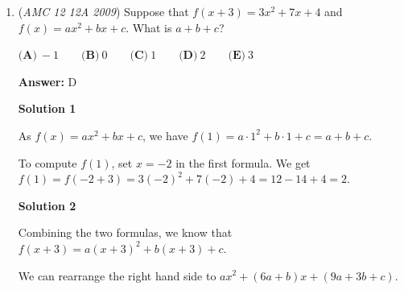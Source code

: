 \begin{enumerate}
 



\textbf{Solution 2}

Let the side length of the smaller square be $1$, and let the smaller side of the rectangles be $y$. Since the larger square's area is four times larger than the smaller square's, the larger square's side length is $2$. $2$ is equivalent to $2y+1$, giving $y=1/2$. Then, the longer side of the rectangles is $3/2$. $\frac{\frac{3}{2}}{\frac{1}{2}}=\boxed{3}$.

 



\textbf{Solution 3}

Let the longer side length be $x$, and the shorter side be $a$.

 We have that $(x+a)^2=4(x-a)^2\implies x+a=2(x-a)\implies x+a=2x-2a\implies x=3a \implies \frac{x}{a}=3$

 Hence, the answer is $\boxed{A}\implies 3$




\textbf{Solution 4}

WLOG, let the shorter side of the rectangle be $1$, and the longer side be $x$ . Thus, the area of the larger square is $(1+x)^2$ . The area of the smaller square is $(x-1)^2$ . Thus, we have the equation $(1+x)^2 = 4 (x-1)^2$ . Solving for $x$, we get $x$ = $3$ .

 


	\item (\textit{AMC 12 12A 2009}) Suppose that $f(x+3)=3x^2 + 7x + 4$ and $f(x)=ax^2 + bx + c$. What is $a+b+c$?


 $\textbf{(A)}\ -1 \qquad \textbf{(B)}\ 0 \qquad \textbf{(C)}\ 1 \qquad \textbf{(D)}\ 2 \qquad \textbf{(E)}\ 3$

 \textbf{Answer: }D



\textbf{Solution 1}

As $f(x)=ax^2 + bx + c$, we have $f(1)=a\cdot 1^2 + b\cdot 1 + c = a+b+c$. 

 To compute $f(1)$, set $x=-2$ in the first formula. We get $f(1) = f(-2+3) = 3(-2)^2 + 7(-2) + 4 = 12 - 14 + 4 = \boxed{2}$.

 



\textbf{Solution 2}

Combining the two formulas, we know that $f(x+3) = a(x+3)^2 + b(x+3) + c$.

 We can rearrange the right hand side to $ax^2 + (6a+b)x + (9a+3b+c)$.


\end{enumerate}

